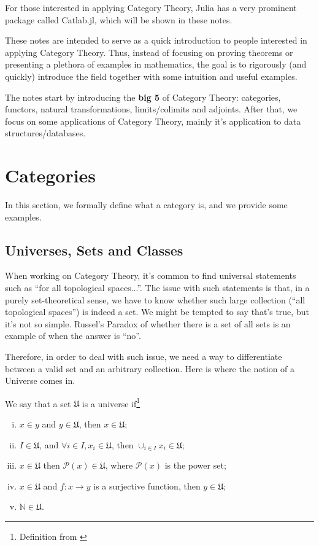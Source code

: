 For those interested in applying Category Theory, Julia has a very
prominent package called Catlab.jl, which will be shown in these notes.

These notes are intended to serve as a quick introduction to people interested
in applying Category Theory. Thus, instead of focusing on proving theorems
or presenting a plethora of examples in mathematics, the goal is to rigorously
(and quickly) introduce the field together with some intuition and useful examples.

The notes start by introducing the \textbf{big 5} of Category Theory:
categories, functors, natural transformations, limits/colimits and adjoints.
After that, we focus on some applications of Category Theory,
mainly it's application to data structures/databases.

\newpage
\section{Categories}

In this section, we formally define what a category is, and we provide
some examples.

\subsection{Universes, Sets and Classes}

When working on Category Theory, it's common to find universal
statements such as ``for all topological spaces...''. The issue
with such statements is that, in a purely set-theoretical sense,
we have to know whether such large collection (``all topological spaces'')
is indeed a set. We might be tempted to say that's true, but
it's not so simple. Russel's Paradox of whether there is a set of all sets
is an example of when the answer is ``no''.

Therefore, in order to deal with such issue, we need a way to differentiate
between a valid set and an arbitrary collection. Here is where the notion of a Universe comes in.

\begin{definition}[Universe]
	We say that a set $\mathfrak U$ is a universe if\footnote{Definition from \citet{borceux1994handbook}}
	\begin{enumerate}[(i)]
		\item $x\in y$ and $ y\in \mathfrak U$, then $x \in \mathfrak U$;
		\item $I \in \mathfrak U$, and $\forall i \in I, x_i \in \mathfrak U$, then $\cup_{i\in I}x_i \in \mathfrak U$;
		\item $x \in \mathfrak U$ then $\mathcal P(x) \in \mathfrak U$, where $\mathcal P(x)$ is the power set;
		\item $x \in \mathfrak U$ and $f:x\to y$ is a surjective function, then $y \in \mathfrak U$;
		\item $\mathbb N \in \mathfrak U$.
	\end{enumerate}
\end{definition}

